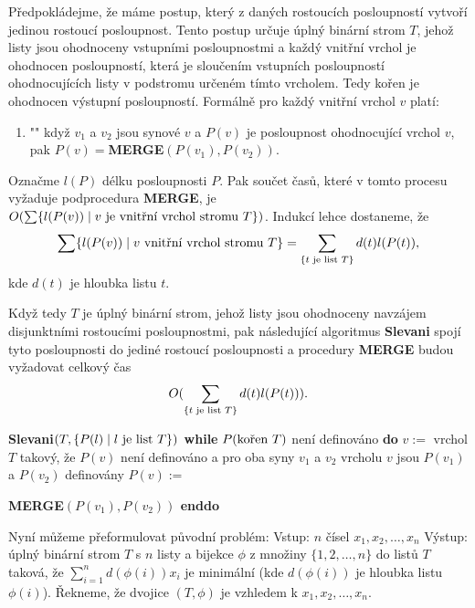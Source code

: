 \documentclass[a4paper,12pt]{article}
\def \emph#1{\underbar{#1}}
\begin{document}
Předpokládejme, že máme postup, který z 
daných rostoucích posloupností vytvoří 
jedinou rostoucí po\-sloupnost. Tento postup určuje úplný 
binární strom $T$, jehož listy jsou ohodnoceny vstupními 
posloupnostmi a každý vnitřní vr\-chol je ohodnocen 
posloupností, která je sloučením vstupních posloupností 
ohodnocujících listy v podstromu určeném tímto 
vr\-cholem. Tedy kořen je ohodnocen výstupní posloupností. 
Formálně pro každý vnitřní vr\-chol  $v$ platí:
\begin{enumerate}
\item"{}"
když  $v_1$ a $v_2$ jsou synové $v$ a $P(v)$ je posloupnost 
ohodnocující vrchol $v$,  pak\newline 
$P(v)=${\bf MERGE$(P(v_1),P(v_2))$}.
\end{enumerate}
Označme $l(P)$ délku posloupnosti $P$. Pak součet 
časů, které v tomto procesu vyžaduje 
podprocedura {\bf MERGE},
je $O(\sum \{l(P(v))\mid v\text{\rm \ je vnitřní vrchol stromu }
T\})$. Indukcí 
lehce dostaneme, že 
$$\sum \{l(P(v))\mid v\text{\rm \ vnitřní vrchol stromu }T
\}=\sum_{\{t\text{\rm \ je list }T\}}d(t)l(P(t)),$$
kde $d(t)$ je hloubka listu $t$.

Když tedy $T$ je úplný binární strom, jehož listy
jsou ohodnoceny navzájem disjunktními rostoucími  
posloupnostmi, pak následující algoritmus {\bf Slevani} spojí tyto  
posloupnosti do jediné rostoucí posloupnosti a procedury 
{\bf MERGE} budou vyžadovat celkový čas 
$$O(\sum_{\{t\text{\rm \ je list }T\}}d(t)l(P(t))).$$

{\bf Slevani$(T,\{P(l)\mid l\text{\rm \ je list }T\})$\newline 
while} $P(\text{\rm kořen }T)$ není definováno {\bf do\newline 
\phantom{{\rm---}}}$v:=$ vrchol $T$ takový, že $P(v)$ není 
definováno a\newline 
\phantom{---}pro oba syny $v_1$ a $v_2$ vrcholu $v$ jsou $P(v_1)$ a $
P(v_2)$ definovány\newline 
\phantom{---}$P(v):=${\bf MERGE$(P(v_1),P(v_2))$\newline 
enddo

}
Nyní můžeme přeformulovat původní 
problém:\newline 
Vstup: $n$ čísel $x_1,x_2,\dots,x_n$\newline 
Výstup: úplný binární strom $T$ s $n$ listy a bijekce $
\phi$ z 
množiny $\{1,2,\dots,n\}$ do listů $T$ taková, že 
$\sum_{i=1}^nd(\phi (i))x_i$ je minimální (kde $d(\phi (i))$ je hloubka 
listu $\phi (i)$).\newline 
\v Rekneme, že dvojice $(T,\phi )$ je \emph{optimální} 
\emph{strom} vzhledem k $x_1,x_2,\dots,x_n$. 
\end{document}
